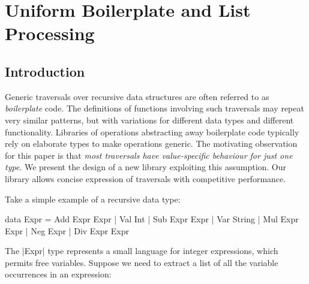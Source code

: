 

\chapter{Uniform Boilerplate and List Processing}


\begin{comment}
\begin{code}
class Uniplate x where
	uniplate :: x -> ([x], [x] -> x)
\end{code}
\begin{code}
class Uniplate x where
\end{code}
\begin{code}
transform' x = transform x
\end{code}
\begin{code}
children = undefined
context = undefined
\end{code}
\end{comment}





\section{Introduction}

Generic traversals over recursive data structures are often referred to as \textit{boilerplate} code. The definitions of functions involving such traversals may repeat very similar patterns, but with variations for different data types and different functionality. Libraries of operations abstracting away boilerplate code typically rely on elaborate types to make operations generic. The motivating observation for this paper is that \textit{most traversals have value-specific behaviour for just one type}. We present the design of a new library exploiting this assumption. Our library allows concise expression of traversals with competitive performance.

Take a simple example of a recursive data type:

\begin{code}
data Expr  =  Add  Expr  Expr  |  Val  Int
           |  Sub  Expr  Expr  |  Var  String
           |  Mul  Expr  Expr  |  Neg  Expr
           |  Div  Expr  Expr
\end{code}

The |Expr| type represents a small language for integer expressions, which permits free variables. Suppose we need to extract a list of all the variable occurrences in an expression:

